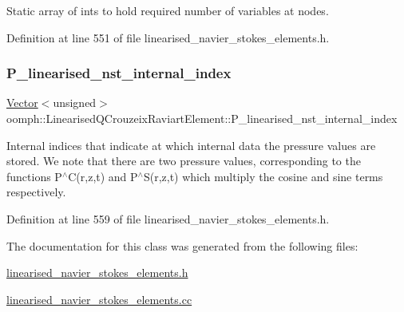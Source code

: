 Static array of ints to hold required number of variables at nodes. 



Definition at line 551 of file linearised\+\_\+navier\+\_\+stokes\+\_\+elements.\+h.

\mbox{\label{classoomph_1_1LinearisedQCrouzeixRaviartElement_ac9cd03df3d45e742cf79ea5c67d69614}} 
\subsubsection{\texorpdfstring{P\+\_\+linearised\+\_\+nst\+\_\+internal\+\_\+index}{P\_linearised\_nst\_internal\_index}}
{\footnotesize\ttfamily \hyperlink{classoomph_1_1Vector}{Vector}$<$unsigned$>$ oomph\+::\+Linearised\+Q\+Crouzeix\+Raviart\+Element\+::\+P\+\_\+linearised\+\_\+nst\+\_\+internal\+\_\+index\hspace{0.3cm}{\ttfamily [protected]}}



Internal indices that indicate at which internal data the pressure values are stored. We note that there are two pressure values, corresponding to the functions P$^\wedge$C(r,z,t) and P$^\wedge$S(r,z,t) which multiply the cosine and sine terms respectively. 



Definition at line 559 of file linearised\+\_\+navier\+\_\+stokes\+\_\+elements.\+h.



The documentation for this class was generated from the following files\+:\begin{DoxyCompactItemize}
\item 
\hyperlink{linearised__navier__stokes__elements_8h}{linearised\+\_\+navier\+\_\+stokes\+\_\+elements.\+h}\item 
\hyperlink{linearised__navier__stokes__elements_8cc}{linearised\+\_\+navier\+\_\+stokes\+\_\+elements.\+cc}\end{DoxyCompactItemize}
